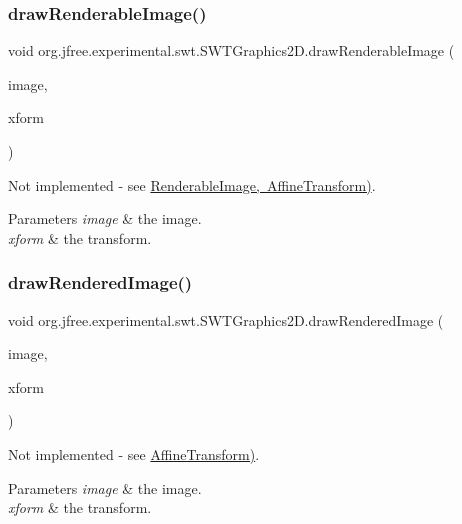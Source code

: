 \subsubsection{\texorpdfstring{draw\+Renderable\+Image()}{drawRenderableImage()}}
{\footnotesize\ttfamily void org.\+jfree.\+experimental.\+swt.\+S\+W\+T\+Graphics2\+D.\+draw\+Renderable\+Image (\begin{DoxyParamCaption}\item[{Renderable\+Image}]{image,  }\item[{Affine\+Transform}]{xform }\end{DoxyParamCaption})}

Not implemented -\/ see \mbox{\hyperlink{}{Renderable\+Image, Affine\+Transform)}}.


\begin{DoxyParams}{Parameters}
{\em image} & the image. \\
\hline
{\em xform} & the transform. \\
\hline
\end{DoxyParams}
\mbox{\label{classorg_1_1jfree_1_1experimental_1_1swt_1_1_s_w_t_graphics2_d_a885135c54d6453fda13876b2deccdc3c}} 
\subsubsection{\texorpdfstring{draw\+Rendered\+Image()}{drawRenderedImage()}}
{\footnotesize\ttfamily void org.\+jfree.\+experimental.\+swt.\+S\+W\+T\+Graphics2\+D.\+draw\+Rendered\+Image (\begin{DoxyParamCaption}\item[{Rendered\+Image}]{image,  }\item[{Affine\+Transform}]{xform }\end{DoxyParamCaption})}

Not implemented -\/ see \mbox{\hyperlink{}{Affine\+Transform)}}.


\begin{DoxyParams}{Parameters}
{\em image} & the image. \\
\hline
{\em xform} & the transform. \\
\hline
\end{DoxyParams}
\mbox{\label{classorg_1_1jfree_1_1experimental_1_1swt_1_1_s_w_t_graphics2_d_a3d2fbddf57a59554f34d16f2c9237794}} 
